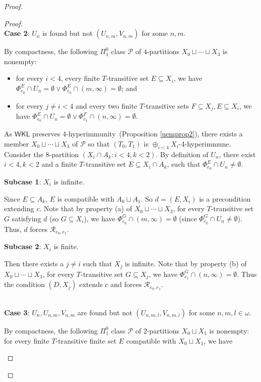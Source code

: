 \documentclass{amsart}
\theoremstyle{definition}
\theoremstyle{remark}
\numberwithin{equation}{section}
\theoremstyle{noparens}
\def\msf{\mathsf}
\def\mcal{\mathcal}
\def\iatfshyp{4-hyperimmune}
\def\propiatfshyp{4-hyperimmunity}
\begin{document}
\begin{proof}
\begin{proof}
\ \\

\noindent\textbf{Case 2}: $U_n$ is found but not
$(U_{n,m},V_{n,m})$ for some $n,m$.

By compactness, the following $\Pi_1^0$ class $\mcal{P}$
of $4$-partitions $X_0\sqcup\cdots\sqcup X_3$
is nonempty:
\begin{itemize}
\item[(a)]  for every $i< 4$, every finite $T$-transitive set $E\subseteq X_i$,
   we have   $\Phi_{e_0}^{E}\cap U_n=\emptyset\vee\Phi_{e_0}^E\cap (  m,\infty)=\emptyset$; and
  \item[(b)] for every $j\ne i<4$ and every two finite $T$-transitive
  sets $F\subseteq X_j, E\subseteq X_i$, we have
  $\Phi_{e_0}^E\cap U_n=\emptyset\vee\Phi_{e_1}^{F}\cap (n,\infty)=\emptyset$.
  \end{itemize}


As $\msf{WKL}$ preserves \propiatfshyp\ (Proposition \ref{uemprop2}),
there exists a  member $X_0\sqcup\cdots\sqcup X_3$ of $\mcal{P}$
so that
$(T_0,T_1)$ is $\oplus_{i<4} X_i$-\iatfshyp.
Consider the
 $8$-partition $(X_i\cap A_k: i<4,k<2)$. By definition of
$U_n$, there exist $i<4,k<2$ and a finite $T$-transitive set
 $E\subseteq X_i\cap A_k$,
 such that
$\Phi_{e_0}^E\cap U_n\ne\emptyset$.


\noindent\textbf{Subcase 1}: $X_i$ is infinite.

Since $E\subseteq A_k$,
$E$ is compatible with $A_0\sqcup A_1$.
So
$d=(E,X_i )$ is a  precondition extending $c$.
Note that by property (a) of $X_0\sqcup\cdots\sqcup X_3$,
for every $T$-transitive set $G$ satisfying $d$ (so $G\subseteq X_i$), we have
$\Phi_{e_0}^G\cap (  m,\infty)=\emptyset$ (since $\Phi_{e_0}^G\cap U_n\ne\emptyset$).
Thus, $d$ forces
$\mcal{R}_{e_0,e_1}$.


\noindent\textbf{Subcase 2}:
$X_i$ is finite.

Then there exists a $j\ne i $ such that $X_j$ is infinite.
Note that  by property (b) of   $X_0\sqcup\cdots\sqcup X_3$,
for every $T$-transitive set $G\subseteq X_j$,
we have
$\Phi_{e_1}^G\cap (n,\infty)=\emptyset$.
Thus the condition $(D,X_j)$ extends $c$ and forces
$\mcal{R}_{e_0,e_1}$.


 \ \\



\noindent\textbf{Case 3}: $U_n,U_{n,m},V_{n,m}$ are found but not
$(U_{n,m,l},V_{n,m,l})$
for some $n,m,l\in\omega$.

By compactness, the following $\Pi_1^0$ class $\mcal{P}$
of $2$-partitions $X_0\sqcup  X_1$
is nonempty: for every   finite $T$-transitive finite set $E $ compatible with $X_0\sqcup X_1$,
  we have
 \begin{itemize}


\end{itemize}
\end{proof}
\end{proof}
\end{document}

